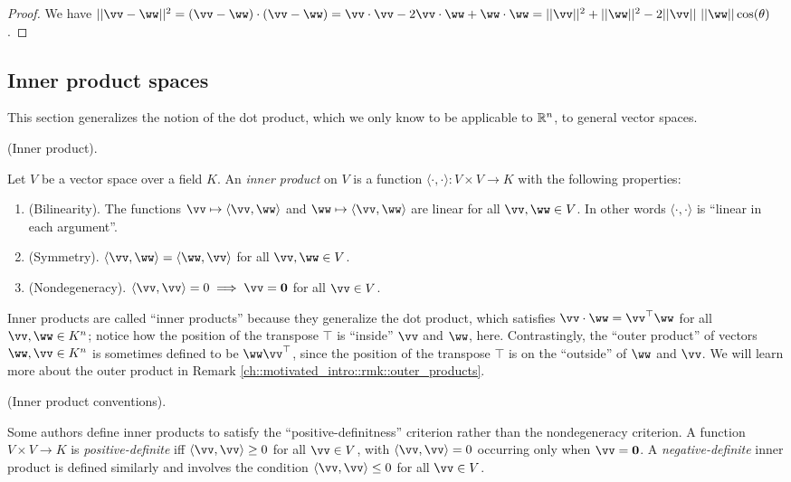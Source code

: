 \begin{proof}
    We have $||\vv - \ww||^2 = (\vv - \ww) \cdot (\vv - \ww) = \vv \cdot \vv - 2 \vv \cdot \ww + \ww \cdot \ww = ||\vv||^2 + ||\ww||^2 - 2 ||\vv|| \spc ||\ww|| \cos(\theta)$.
\end{proof}

\newpage

\subsection*{Inner product spaces}

This section generalizes the notion of the dot product, which we only know to be applicable to $\mathbb{R}^n$, to general vector spaces.

\begin{defn}
    \label{ch::lin_alg::defn::inner_product}
    (Inner product).
    
    Let $V$ be a vector space over a field $K$. An \textit{inner product} on $V$ is a function $\langle \cdot, \cdot \rangle:V \times V \rightarrow K$ with the following properties:

    \begin{enumerate}
        \item (Bilinearity). The functions $\vv \mapsto \langle \vv, \ww \rangle$ and $\ww \mapsto \langle \vv, \ww \rangle$ are linear for all $\vv, \ww \in V$. In other words $\langle \cdot, \cdot \rangle$ is ``linear in each argument''.
        \item (Symmetry). $\langle \vv, \ww \rangle = \langle \ww, \vv \rangle$ for all $\vv, \ww \in V$.
        \item (Nondegeneracy). $\langle \vv, \vv \rangle = 0 \implies \vv = \mathbf{0}$ for all $\vv \in V$.
    \end{enumerate}

    Inner products are called ``inner products'' because they generalize the dot product, which satisfies ${\vv \cdot \ww = \vv^\top \ww}$ for all $\vv, \ww \in K^n$; notice how the position of the transpose $\top$ is ``inside'' $\vv$ and $\ww$, here. Contrastingly, the ``outer product'' of vectors $\ww, \vv \in K^n$ is sometimes defined to be $\ww \vv^\top$, since the position of the transpose $\top$ is on the ``outside'' of $\ww$ and $\vv$. We will learn more about the outer product in Remark \ref{ch::motivated_intro::rmk::outer_products}.
\end{defn}

\begin{remark}
\label{ch::lin_alg::rmk::inner_product_conventions}
    (Inner product conventions).

    Some authors define inner products to satisfy the ``positive-definitness'' criterion rather than the nondegeneracy criterion. A function $V \times V \rightarrow K$ is \textit{positive-definite} iff $\langle \vv, \vv \rangle \geq 0$ for all $\vv \in V$, with $\langle \vv, \vv \rangle = 0$ occurring only when $\vv = \mathbf{0}$. A \textit{negative-definite} inner product is defined similarly and involves the condition $\langle \vv, \vv \rangle \leq 0$ for all $\vv \in V$.
\end{remark}

